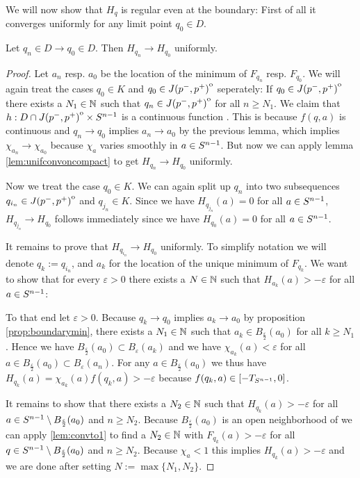 We will now show that $H_q$ is regular even at the boundary:
First of all it converges uniformly for any limit point $q_0\in D$.
\begin{proposition}\label{prop:hunif}
    Let $q_n\in D\to q_0\in D$. Then $H_{q_n}\to H_{q_0}$ uniformly.
\end{proposition}
\begin{proof}
    Let $a_n$ resp. $a_0$ be the location of the minimum of $F_{q_n}$ resp. $F_{q_0}$.
    We will again treat the cases $q_0\in K$ and $q_0\in {\kern0ptJ(p^-,p^+)}^{\mathrm{o}}$ seperately:
    If $q_0\in {\kern0ptJ(p^-,p^+)}^{\mathrm{o}}$ there exists a $N_1\in \mathbb{N}$ such that $q_n \in {\kern0ptJ(p^-,p^+)}^{\mathrm{o}}$ for all $n\ge N_1$. We claim that $h:D\cap {\kern0ptJ(p^-,p^+)}^{\mathrm{o}}\times {S^{n-1}}$ is a continuous function . This is because $f(q,a)$ is continuous and $q_n\to q_0$ implies $a_n\to a_0$ by the previous lemma, which implies $\chi_{a_n}\to \chi_{a_0}$ because $\chi_a$ varies smoothly in $a\in {S^{n-1}}$. But now we can apply lemma \ref{lem:unifconvoncompact} to get $H_{q_n}\to H_{q_0}$ uniformly.

    Now we treat the case $q_0\in K$. We can again split up $q_n$ into two subsequences $q_{i_n}\in {\kern0ptJ(p^-,p^+)}^{\mathrm{o}}$ and $q_{j_n}\in K$. Since we have $H_{q_{j_n}}(a)=0$ for all $a\in {S^{n-1}}$, $H_{q_{j_n}}\to H_{q_0}$ follows immediately since we have $H_{q_0}(a)=0$ for all $a\in {S^{n-1}}$.

    It remains to prove that $H_{q_{i_n}}\to H_{q_0}$ uniformly. To simplify notation we will denote $q_k:=q_{i_n}$, and $a_k$ for the location of the unique minimum of $F_{q_k}$. We want to show that for every $\varepsilon>0$ there exists a $N\in \mathbb{N}$ such that $H_{a_k}(a)>-\varepsilon$ for all $a\in {S^{n-1}}$:

    To that end let $\varepsilon>0$. Because $q_k\to q_0$ implies $a_k\to a_0$ by proposition \ref{prop:boundarymin}, there exists a $N_1\in \mathbb{N}$ such that $a_k\in B_\frac{\varepsilon}{2}(a_0)$ for all $k\ge N_1$. Hence we have $B_\frac{\varepsilon}{2}(a_0)\subset B_\varepsilon(a_k)$ and we have $\chi_{a_k}(a)<\varepsilon$ for all $a\in B_\frac{\varepsilon}{2}(a_0)\subset B_\varepsilon(a_n)$.
    For any $a\in B_\frac{\varepsilon}{2}(a_0)$ we thus have $H_{q_k}(a) = \chi_{a_k}(a)f(q_k,a) > -\varepsilon$ because $f(q_k,a)\in [-T_{S^{n-1}},0]$.

    It remains to show that there exists a $N_2\in \mathbb{N}$ such that $H_{q_k}(a) > -\varepsilon$ for all $a\in {S^{n-1}}\setminus B_\frac{\varepsilon}{2}(a_0)$ and $n\ge N_2$. Because $B_\frac{\varepsilon}{2}(a_0)$ is an open neighborhood of we can apply \ref{lem:convto1} to find a $N_2\in \mathbb{N}$ with $F_{q_k}(a) > -\varepsilon$ for all $q\in {S^{n-1}} \setminus B_\frac{\varepsilon}{2}(a_0)$ and $n \ge N_2$. Because $\chi_{a}<1$ this implies $H_{q_k}(a) > -\varepsilon$ and we are done after setting $N:= \max \{N_1,N_2\}$.
\end{proof}

